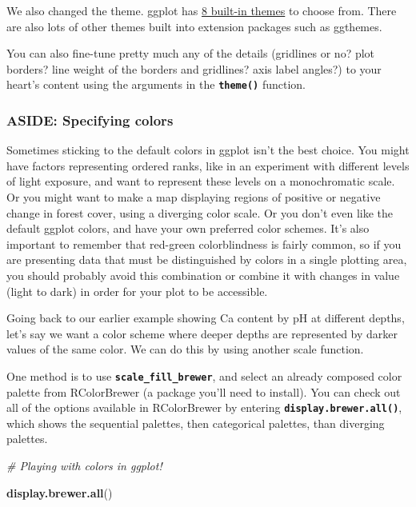 \documentclass[
]{article}
\newenvironment{Shaded}{\begin{snugshade}}{\end{snugshade}}
\newcommand{\CommentTok}[1]{\textcolor[rgb]{0.56,0.35,0.01}{\textit{#1}}}
\newcommand{\FunctionTok}[1]{\textcolor[rgb]{0.13,0.29,0.53}{\textbf{#1}}}
\newcommand{\NormalTok}[1]{#1}
\begin{document}
We also changed the theme. ggplot has
\href{http://r4ds.had.co.nz/images/visualization-themes.png}{8 built-in
themes} to choose from. There are also lots of other themes built into
extension packages such as ggthemes.

You can also fine-tune pretty much any of the details (gridlines or no?
plot borders? line weight of the borders and gridlines? axis label
angles?) to your heart's content using the arguments in the
\textbf{\texttt{theme()}} function.

\hypertarget{aside-specifying-colors}{%
\subsubsection{ASIDE: Specifying colors}\label{aside-specifying-colors}}

Sometimes sticking to the default colors in ggplot isn't the best
choice. You might have factors representing ordered ranks, like in an
experiment with different levels of light exposure, and want to
represent these levels on a monochromatic scale. Or you might want to
make a map displaying regions of positive or negative change in forest
cover, using a diverging color scale. Or you don't even like the default
ggplot colors, and have your own preferred color schemes. It's also
important to remember that red-green colorblindness is fairly common, so
if you are presenting data that must be distinguished by colors in a
single plotting area, you should probably avoid this combination or
combine it with changes in value (light to dark) in order for your plot
to be accessible.

Going back to our earlier example showing Ca content by pH at different
depths, let's say we want a color scheme where deeper depths are
represented by darker values of the same color. We can do this by using
another scale function.

One method is to use \textbf{\texttt{scale\_fill\_brewer}}, and select
an already composed color palette from RColorBrewer (a package you'll
need to install). You can check out all of the options available in
RColorBrewer by entering \textbf{\texttt{display.brewer.all()}}, which
shows the sequential palettes, then categorical palettes, than diverging
palettes.

\begin{Shaded}
\begin{Highlighting}[]
\CommentTok{\# Playing with colors in ggplot!}

\FunctionTok{display.brewer.all}\NormalTok{()}
\end{Highlighting}
\end{Shaded}
\end{document}
